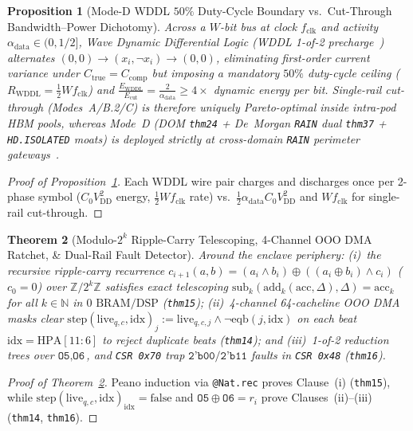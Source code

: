 \documentclass[11pt,letterpaper]{article}
\theoremstyle{spectralthm}
\newtheorem{theorem}{Theorem}[section]
\newtheorem{proposition}[theorem]{Proposition}
\begin{document}
\begin{proposition}[Mode-D WDDL $50\%$ Duty-Cycle Boundary vs.\ Cut-Through Bandwidth--Power Dichotomy]
\label{prop:wddl_dichotomy}
Across a $W$-bit bus at clock $f_{\mathrm{clk}}$ and activity $\alpha_{\mathrm{data}} \in (0, 1/2]$, Wave Dynamic Differential Logic (WDDL 1-of-2 precharge~\cite{gross2016dom}) alternates $(0,0) \rightarrow (x_i, \neg x_i) \rightarrow (0,0)$, eliminating first-order current variance under $C_{\mathrm{true}} = C_{\mathrm{comp}}$ but imposing a mandatory $50\%$ duty-cycle ceiling ($R_{\mathrm{WDDL}} = \frac{1}{2} W f_{\mathrm{clk}}$) and $\frac{E_{\mathrm{WDDL}}}{E_{\mathrm{cut}}} = \frac{2}{\alpha_{\mathrm{data}}} \ge 4\times$ dynamic energy per bit. Single-rail cut-through (Modes~A/B.2/C) is therefore uniquely Pareto-optimal inside intra-pod HBM pools, whereas Mode~D (DOM \texttt{thm24} + De~Morgan \texttt{RAIN} dual \texttt{thm37} + \texttt{HD.ISOLATED} moats) is deployed strictly at cross-domain \texttt{RAIN} perimeter gateways~\cite{ncdsmo2020rain}.
\end{proposition}
\begin{proof}[Proof of Proposition~\ref{prop:wddl_dichotomy}]
Each WDDL wire pair charges and discharges once per 2-phase symbol ($C_0 V_{\mathrm{DD}}^2$ energy, $\frac{1}{2} W f_{\mathrm{clk}}$ rate) vs.\ $\frac{1}{2}\alpha_{\mathrm{data}} C_0 V_{\mathrm{DD}}^2$ and $W f_{\mathrm{clk}}$ for single-rail cut-through.
\end{proof}

\begin{theorem}[Modulo-$2^k$ Ripple-Carry Telescoping, 4-Channel OOO DMA Ratchet, \& Dual-Rail Fault Detector]
\label{thm:extensions}
Around the enclave periphery: (i)~the recursive ripple-carry recurrence $c_{i+1}(a,b) = (a_i \wedge b_i) \oplus ((a_i \oplus b_i) \wedge c_i)$ ($c_0 = 0$) over $\mathbb{Z}/2^k\mathbb{Z}$ satisfies exact telescoping $\mathrm{sub}_k(\mathrm{add}_k(\mathrm{acc}, \Delta), \Delta) = \mathrm{acc}_k$ for all $k \in \mathbb{N}$ in $0\text{~BRAM/DSP}$ (\texttt{thm15}); (ii)~4-channel 64-cacheline OOO DMA masks clear $\mathrm{step}(\mathrm{live}_{q,c}, \mathrm{idx})_j := \mathrm{live}_{q,c,j} \wedge \neg\mathrm{eqb}(j, \mathrm{idx})$ on each beat $\mathrm{idx} = \mathrm{HPA}[11:6]$ to reject duplicate beats (\texttt{thm14}); and (iii)~1-of-2 reduction trees over $\texttt{O5}, \texttt{O6}$, and \texttt{CSR 0x70} trap $\texttt{2'b00}/\texttt{2'b11}$ faults in \texttt{CSR 0x48} (\texttt{thm16}).
\end{theorem}
\begin{proof}[Proof of Theorem~\ref{thm:extensions}]
Peano induction via \texttt{@Nat.rec} proves Clause~(i) (\texttt{thm15}), while $\mathrm{step}(\mathrm{live}_{q,c},\mathrm{idx})_{\mathrm{idx}} = \mathrm{false}$ and $\texttt{O5} \oplus \texttt{O6} = r_i$ prove Clauses~(ii)--(iii) (\texttt{thm14}, \texttt{thm16}).
\end{proof}
\end{document}
